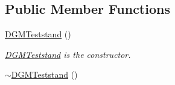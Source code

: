 \subsection*{Public Member Functions}
\begin{DoxyCompactItemize}
\item 
\hyperlink{classdg__blmc__robots_1_1DGMTeststand_ae6b6e00fbd3460f7083977ae9befb6fd}{D\+G\+M\+Teststand} ()\hypertarget{classdg__blmc__robots_1_1DGMTeststand_ae6b6e00fbd3460f7083977ae9befb6fd}{}\label{classdg__blmc__robots_1_1DGMTeststand_ae6b6e00fbd3460f7083977ae9befb6fd}

\begin{DoxyCompactList}\small\item\em \hyperlink{classdg__blmc__robots_1_1DGMTeststand}{D\+G\+M\+Teststand} is the constructor. \end{DoxyCompactList}\item 
\hyperlink{classdg__blmc__robots_1_1DGMTeststand_a8699f157b5a05c92a5de2b2c80ba70af}{$\sim$\+D\+G\+M\+Teststand} ()\hypertarget{classdg__blmc__robots_1_1DGMTeststand_a8699f157b5a05c92a5de2b2c80ba70af}{}\label{classdg__blmc__robots_1_1DGMTeststand_a8699f157b5a05c92a5de2b2c80ba70af}


\end{DoxyCompactItemize}
